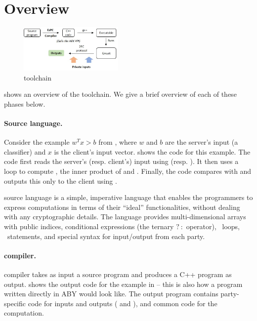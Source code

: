 
\section{\tool Overview}
\label{sec:ex}

\begin{figure}
  \includegraphics[width=0.45\textwidth]{toolchain}
\caption{\tool toolchain}
\label{fig:toolchain}
\end{figure}

 shows an overview of the \tool
toolchain. We give a brief overview of each of these phases below.

\paragraph{Source language.}
Consider the example $w^Tx >b$ from , where
$w$ and $b$ are the server's input (a classifier) and $x$ is
the client's input vector.  shows the \tool code
for this example. The code first reads the server's (resp. client's) input using
  (resp. ). It then uses a
 loop to compute , the inner product of  and
. Finally, the code compares 
with  and outputs this only to the client using .

\tool source language is a simple, imperative language that enables
the programmers to express \mpc computations in terms of their
``ideal'' functionalities, without dealing with any cryptographic
details. The language provides multi-dimensional arrays with public indices, conditional
expressions (the ternary $?\::$ operator), ~loops,
~statements, and special syntax for input/output from each party.


\paragraph{\tool compiler.}
\tool compiler takes as input a source program and produces a C++
program as output.  shows the output code for
the example in  -- this is also how a program written directly in
  ABY would look like. The output program
contains party-specific code for inputs and outputs
( and ), and common code for the
computation.

